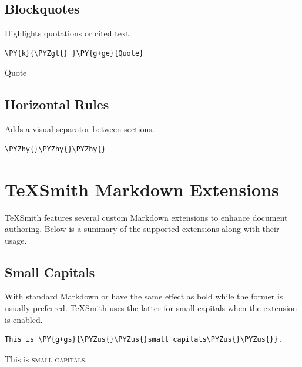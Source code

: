 \documentclass[a4paper,twoside]{article}
\begin{document}
\subsection{Blockquotes}
Highlights quotations or cited text.
\begin{tscode}[lang=md, engine=pygments]
\begin{Verbatim}[commandchars=\\\{\},breaklines, breakanywhere, commandchars=\\\{\}]
\PY{k}{\PYZgt{} }\PY{g+ge}{Quote}
\end{Verbatim}
\end{tscode}
\begin{displayquote}
Quote
\end{displayquote}
\subsection{Horizontal Rules}
Adds a visual separator between sections.
\begin{tscode}[lang=md, engine=pygments]
\begin{Verbatim}[commandchars=\\\{\},breaklines, breakanywhere, commandchars=\\\{\}]
\PYZhy{}\PYZhy{}\PYZhy{}
\end{Verbatim}
\end{tscode}
\begin{displayquote}
\tsdivider
\end{displayquote}
\section{TeXSmith Markdown Extensions}
TeXSmith features several custom Markdown extensions to enhance document authoring.
Below is a summary of the supported extensions along with their usage.
\subsection{Small Capitals}
With standard Markdown \tscodeinline{**} or \tscodeinline{\_\_} have the same effect as bold while the former is usually preferred. TeXSmith uses the latter for small capitals when the 
extension is enabled.
\begin{tscode}[lang=md, engine=pygments]
\begin{Verbatim}[commandchars=\\\{\},breaklines, breakanywhere, commandchars=\\\{\}]
This is \PY{g+gs}{\PYZus{}\PYZus{}small capitals\PYZus{}\PYZus{}}.
\end{Verbatim}
\end{tscode}
\begin{displayquote}
This is \textsc{small capitals}.
\end{displayquote}
\end{document}

